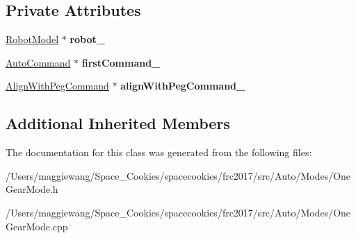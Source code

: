\subsection*{Private Attributes}
\begin{DoxyCompactItemize}
\item 
\mbox{\label{class_one_gear_mode_ad1b467771c98dc4e3156aea381390a00}} 
\hyperlink{class_robot_model}{Robot\+Model} $\ast$ {\bfseries robot\+\_\+}
\item 
\mbox{\label{class_one_gear_mode_ad7d249a36949edf64d23759c626e4c98}} 
\hyperlink{class_auto_command}{Auto\+Command} $\ast$ {\bfseries first\+Command\+\_\+}
\item 
\mbox{\label{class_one_gear_mode_a622236cb11ee049a22db35761fe2b07f}} 
\hyperlink{class_align_with_peg_command}{Align\+With\+Peg\+Command} $\ast$ {\bfseries align\+With\+Peg\+Command\+\_\+}
\end{DoxyCompactItemize}
\subsection*{Additional Inherited Members}


The documentation for this class was generated from the following files\+:\begin{DoxyCompactItemize}
\item 
/\+Users/maggiewang/\+Space\+\_\+\+Cookies/spacecookies/frc2017/src/\+Auto/\+Modes/One\+Gear\+Mode.\+h\item 
/\+Users/maggiewang/\+Space\+\_\+\+Cookies/spacecookies/frc2017/src/\+Auto/\+Modes/One\+Gear\+Mode.\+cpp\end{DoxyCompactItemize}
